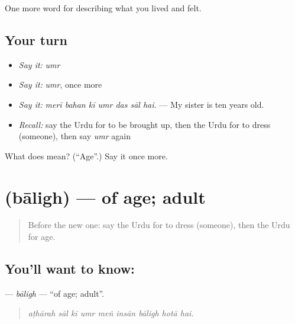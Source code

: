 \begin{grammarlens}[title={What you've built}]
One more word for describing what you lived and felt.
\end{grammarlens}

\subsection*{Your turn}
\begin{itemize}
\raggedright
  \item \emph{Say it:} \emph{umr}
  \item \emph{Say it:} \emph{umr}, once more
  \item \emph{Say it:} \emph{merī bahan kī umr das sāl hai.} — My sister is ten years old.
  \item \emph{Recall:} say the Urdu for to be brought up, then the Urdu for to dress (someone), then say \emph{umr} again
\end{itemize}

\begin{tcolorbox}[breakable,colback=teal!4,colframe=teal!35!black,title={Before you move on}]
What does  mean? (\textquotedblleft{}Age\textquotedblright{}.) Say it once more.
\end{tcolorbox}
\section[\texorpdfstring{\ur{بالغ} (bāligh)}{بالغ (bāligh)}]{ (bāligh) — of age; adult}

\label{lesson:UR-C486-baligh}



\begin{quote}
Before the new one: say the Urdu for to dress (someone), then the Urdu for age.
\end{quote}

\subsection*{You'll want to know: }
\textbf{} — \emph{bāligh} — \textquotedblleft{}of age; adult\textquotedblright{}.

\begin{quote}
        
\end{quote}

\begin{quote}
\emph{aṭhārah sāl kī umr meṅ insān bāligh hotā hai.}
\end{quote}

